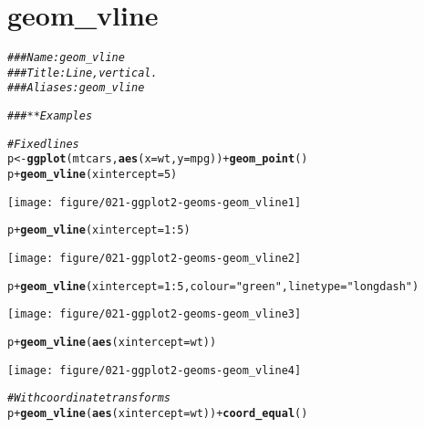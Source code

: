 \documentclass[a4paper,titlepage]{tufte-handout}\usepackage[]{graphicx}\usepackage[]{color}
\makeatletter
\def\maxwidth{ %
  \ifdim\Gin@nat@width>\linewidth
    \linewidth
  \else
    \Gin@nat@width
  \fi
}
\newcommand{\hlnum}[1]{\textcolor[rgb]{0.686,0.059,0.569}{#1}}%
\newcommand{\hlstr}[1]{\textcolor[rgb]{0.192,0.494,0.8}{#1}}%
\newcommand{\hlcom}[1]{\textcolor[rgb]{0.678,0.584,0.686}{\textit{#1}}}%
\newcommand{\hlopt}[1]{\textcolor[rgb]{0,0,0}{#1}}%
\newcommand{\hlstd}[1]{\textcolor[rgb]{0.345,0.345,0.345}{#1}}%
\newcommand{\hlkwb}[1]{\textcolor[rgb]{0.69,0.353,0.396}{#1}}%
\newcommand{\hlkwc}[1]{\textcolor[rgb]{0.333,0.667,0.333}{#1}}%
\newcommand{\hlkwd}[1]{\textcolor[rgb]{0.737,0.353,0.396}{\textbf{#1}}}%
\newenvironment{kframe}{%
 \def\at@end@of@kframe{}%
 \ifinner\ifhmode%
  \def\at@end@of@kframe{\end{minipage}}%
  \begin{minipage}{\columnwidth}%
 \fi\fi%
 \def\FrameCommand##1{\hskip\@totalleftmargin \hskip-\fboxsep
 \colorbox{shadecolor}{##1}\hskip-\fboxsep
     \hskip-\linewidth \hskip-\@totalleftmargin \hskip\columnwidth}%
 \MakeFramed {\advance\hsize-\width
   \@totalleftmargin\z@ \linewidth\hsize
   \@setminipage}}%
 {\par\unskip\endMakeFramed%
 \at@end@of@kframe}
\newenvironment{knitrout}{}{} %
\makeatother
\begin{document}
\section{geom\_vline}

\begin{knitrout}
\color{fgcolor}\begin{kframe}
\begin{alltt}
\hlcom{### Name: geom_vline}
\hlcom{### Title: Line, vertical.}
\hlcom{### Aliases: geom_vline}

\hlcom{### ** Examples}

\hlcom{# Fixed lines}
\hlstd{p} \hlkwb{<-} \hlkwd{ggplot}\hlstd{(mtcars,} \hlkwd{aes}\hlstd{(}\hlkwc{x} \hlstd{= wt,} \hlkwc{y} \hlstd{= mpg))} \hlopt{+} \hlkwd{geom_point}\hlstd{()}
\hlstd{p} \hlopt{+} \hlkwd{geom_vline}\hlstd{(}\hlkwc{xintercept} \hlstd{=} \hlnum{5}\hlstd{)}
\end{alltt}
\end{kframe}
\texttt{[image: figure/021-ggplot2-geoms-geom\_vline1]} 
\begin{kframe}\begin{alltt}
\hlstd{p} \hlopt{+} \hlkwd{geom_vline}\hlstd{(}\hlkwc{xintercept} \hlstd{=} \hlnum{1}\hlopt{:}\hlnum{5}\hlstd{)}
\end{alltt}
\end{kframe}
\texttt{[image: figure/021-ggplot2-geoms-geom\_vline2]} 
\begin{kframe}\begin{alltt}
\hlstd{p} \hlopt{+} \hlkwd{geom_vline}\hlstd{(}\hlkwc{xintercept} \hlstd{=} \hlnum{1}\hlopt{:}\hlnum{5}\hlstd{,} \hlkwc{colour}\hlstd{=}\hlstr{"green"}\hlstd{,} \hlkwc{linetype} \hlstd{=} \hlstr{"longdash"}\hlstd{)}
\end{alltt}
\end{kframe}
\texttt{[image: figure/021-ggplot2-geoms-geom\_vline3]} 
\begin{kframe}\begin{alltt}
\hlstd{p} \hlopt{+} \hlkwd{geom_vline}\hlstd{(}\hlkwd{aes}\hlstd{(}\hlkwc{xintercept} \hlstd{= wt))}
\end{alltt}
\end{kframe}
\texttt{[image: figure/021-ggplot2-geoms-geom\_vline4]} 
\begin{kframe}\begin{alltt}
\hlcom{# With coordinate transforms}
\hlstd{p} \hlopt{+} \hlkwd{geom_vline}\hlstd{(}\hlkwd{aes}\hlstd{(}\hlkwc{xintercept} \hlstd{= wt))} \hlopt{+} \hlkwd{coord_equal}\hlstd{()}

\end{alltt}
\end{kframe}
\end{knitrout}
\end{document}
